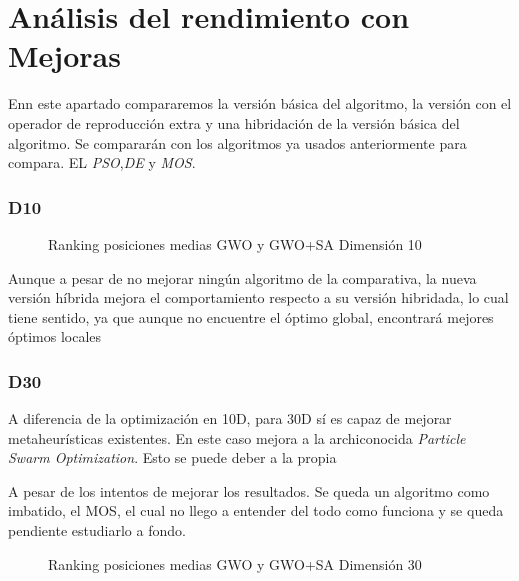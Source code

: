 \documentclass[a4paper, 12.5pt]{report}
\begin{document}
\section{Análisis del rendimiento con Mejoras}

Enn este apartado compararemos la versión básica del algoritmo, la versión con el operador de reproducción extra y una hibridación de la versión básica del algoritmo. Se compararán con los algoritmos ya usados anteriormente para compara. EL \textit{PSO},\textit{DE} y \textit{MOS}.

\subsubsection*{D10}
% 

% 

\begin{figure}[H]
    \centering
    \caption{Ranking posiciones medias GWO y GWO+SA Dimensión 10}

\end{figure}

Aunque a pesar de no mejorar ningún algoritmo de la comparativa, la nueva versión híbrida mejora el comportamiento respecto a su versión hibridada, lo cual tiene sentido, ya que aunque no encuentre el óptimo global, encontrará mejores óptimos locales

\subsubsection*{D30}

A diferencia de la optimización en 10D, para 30D sí es capaz de mejorar metaheurísticas existentes. En este caso mejora a la archiconocida \textit{Particle Swarm Optimization}. Esto se puede deber a la propia

A pesar de los intentos de mejorar los resultados. Se queda un algoritmo como imbatido, el MOS, el cual no llego a entender del todo como funciona y se queda pendiente estudiarlo a fondo.

\begin{figure}[H]
    \centering
    \caption{Ranking posiciones medias GWO y GWO+SA Dimensión 30}


\end{figure}
\end{document}
